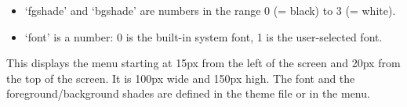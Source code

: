   \begin{itemize}
    \item `fgshade' and `bgshade' are numbers in the range 0 (= black) to 3
    (= white).
    \item `font' is a number: 0 is the built-in system font, 1 is the
    user-selected font.
  \end{itemize}

\begin{example}
\end{example}
This displays the menu starting at 15px from the left of the screen and 20px
from the top of the screen.  It is 100px wide and 150px high.
The font and the foreground/background shades are defined in the theme
 file or in the  menu.

